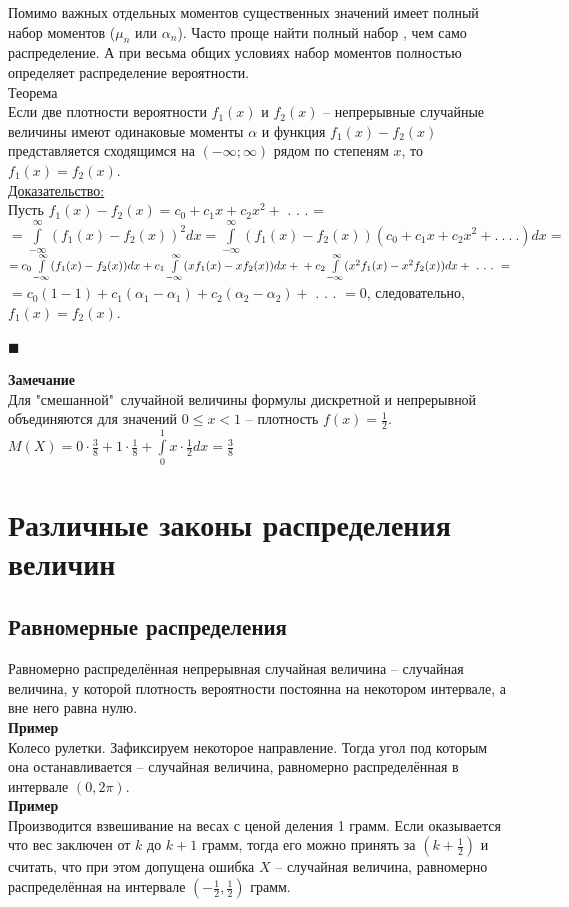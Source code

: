 \documentclass[russian, 12pt, fleqn]{article}
\begin{document}
Помимо важных отдельных моментов существенных значений имеет полный набор моментов ($\mu_n$ или $\alpha_n$). Часто проще найти полный набор %
, чем само распределение. А при весьма общих условиях набор моментов полностью определяет распределение вероятности.\\
$\textbf{Теорема}$\\
Если две плотности вероятности $f_1(x)$ и $f_2(x)$ -- непрерывные случайные величины имеют одинаковые моменты $\alpha$ и функция $f_1(x) - f_2(x)$ представляется сходящимся на $(-\infty;\infty)$ рядом по степеням $x$, то $f_1(x) = f_2(x)$.\\
\underline{Доказательство:}\\
Пусть $f_1(x) - f_2(x)= c_0 + c_1x + c_2x^2 +$ . . . =\\
$=\int\limits_{-\infty}^{\infty} (f_1(x) - f_2(x))^2dx = \int\limits_{-\infty}^{\infty} (f_1(x) - f_2(x))(c_0 + c_1x + c_2x^2 + .\ .\ .\ .)dx=$\\
$=c_0\int\limits_{-\infty}^{\infty}(f_1(x)-f_2(x))dx + c_1\int\limits_{-\infty}^{\infty}(xf_1(x) - xf_2(x))dx +\\ +   c_2\int\limits_{-\infty}^{\infty}(x^2f_1(x) - x^2f_2(x))dx  + \ . \ .\ .\ = $\\
$=c_0(1 - 1) + c_1(\alpha_1-\alpha_1) + c_2(\alpha_2 - \alpha_2) + $ . . . $=0$, следовательно, $f_1(x) = f_2(x)$.
\begin{flushright}\(\blacksquare\)\end{flushright}
\textbf{Замечание\ } \\ 
Для "смешанной"\  случайной величины формулы дискретной и непрерывной объединяются для значений $0\leq x< 1$ -- плотность $f(x) = \frac{1}{2}$.\\
$M(X) = 0\cdot \frac{3}{8} + 1\cdot \frac{1}{8} + \int\limits_{0}^{1}x\cdot \frac{1}{2} dx = \frac{3}{8}$

\section{Различные законы распределения величин}
\subsection{Равномерные распределения}
\noindent
Равномерно распределённая непрерывная случайная величина -- случайная величина, у которой плотность вероятности постоянна на некотором интервале, а вне него равна нулю.\\
\textbf{Пример\ }\\
Колесо рулетки. Зафиксируем некоторое направление. Тогда угол под которым она останавливается -- случайная величина, равномерно распределённая в интервале $(0, 2\pi)$.\\
\textbf{Пример\ }\\
Производится взвешивание на весах с ценой деления 1 грамм. Если оказывается что вес заключен от $k$ до $k + 1$ грамм, тогда его можно принять за $(k + \frac{1}{2})$ и считать, что при этом допущена ошибка $X$ -- случайная величина, равномерно распределённая на интервале $(-\frac{1}{2}, \frac{1}{2})$ грамм.\\
\end{document}
